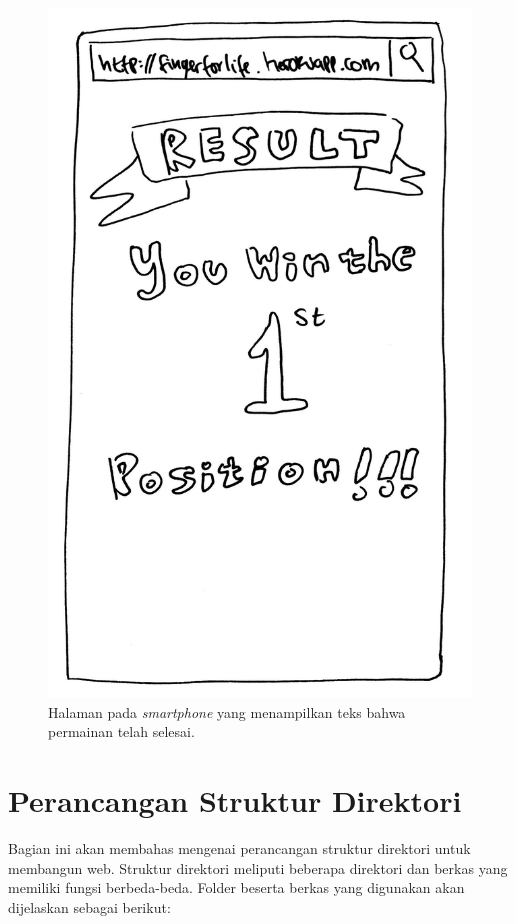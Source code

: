\begin{enumerate}
\begin{figure}[H]
	\centering
	\includegraphics[scale=0.1]{Gambar/mob6_win}
	\caption{Halaman pada \textit{smartphone} yang menampilkan teks bahwa permainan telah selesai.}
	\label{fig:mob6_win}
\end{figure}
	
\end{enumerate}

\section{Perancangan Struktur Direktori}

Bagian ini akan membahas mengenai perancangan struktur direktori untuk membangun web. Struktur direktori meliputi beberapa direktori dan berkas yang memiliki fungsi berbeda-beda. Folder beserta berkas yang digunakan akan dijelaskan sebagai berikut:

